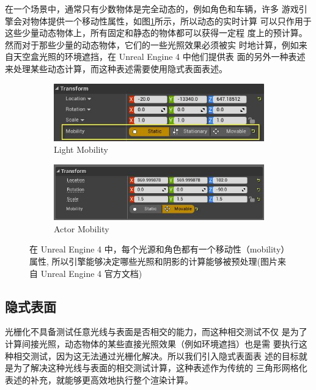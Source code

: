 在一个场景中，通常只有少数物体是完全动态的，例如角色和车辆，许多 游戏引擎会对物体提供一个移动性属性，如图\ref{f:df-mobility}所示，所以动态的实时计算 可以只作用于这些少量动态物体上，所有固定和静态的物体都可以获得一定程 度上的预计算。然而对于那些少量的动态物体，它们的一些光照效果必须被实 时地计算，例如来自天空盒光照的环境遮挡，在 Unreal Engine 4 中他们提供表 面的另外一种表述来处理某些动态计算，而这种表述需要使用隐式表面表述。

\begin{figure}
\begin{fullwidth}
	\begin{subfigure}[b]{0.49\thewidth}
		\includegraphics[width=\textwidth]{figures/df/IL_mobility}
		\caption{Light Mobility}
	\end{subfigure}
	\begin{subfigure}[b]{0.51\thewidth}
		\includegraphics[width=\textwidth]{figures/df/TransformMobility}
		\caption{Actor Mobility}
	\end{subfigure}
	\caption{在 Unreal Engine 4 中，每个光源和角色都有一个移动性（mobility）属性, 所以引擎能够决定哪些光照和阴影的计算能够被预处理(图片来自 Unreal Engine 4 官方文档)}
	\label{f:df-mobility}
\end{fullwidth}
\end{figure}



\subsection{隐式表面}
光栅化不具备测试任意光线与表面是否相交的能力，而这种相交测试不仅 是为了计算间接光照，动态物体的某些直接光照效果（例如环境遮挡）也是需 要执行这种相交测试，因为这无法通过光栅化解决。所以我们引入隐式表面表 述的目标就是为了解决这种光线与表面的相交测试计算，这种表述作为传统的 三角形网格化表述的补充，就能够更高效地执行整个渲染计算。

